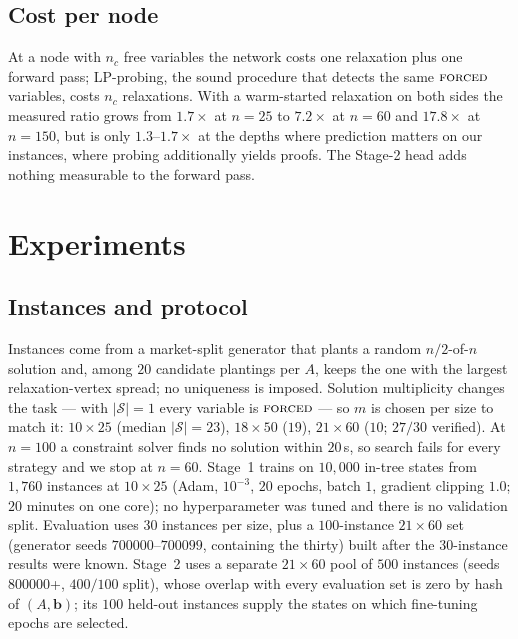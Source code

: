 \documentclass[final,5p,times,twocolumn]{elsarticle}
\newcommand{\SOL}{\mathcal{S}}
\newcommand{\FORCED}{\textsc{forced}}
\begin{document}
\subsection{Cost per node}
\label{sec:method-cost}

At a node with $n_c$ free variables the network costs one relaxation plus one forward pass; LP-probing, the sound procedure that detects the same $\FORCED$ variables, costs $n_c$ relaxations. With a warm-started relaxation on both sides the measured ratio grows from $1.7\times$ at $n=25$ to $7.2\times$ at $n=60$ and $17.8\times$ at $n=150$, but is only $1.3$--$1.7\times$ at the depths where prediction matters on our instances, where probing additionally yields proofs. The Stage-2 head adds nothing measurable to the forward pass.

\section{Experiments}
\label{sec:exp}

\subsection{Instances and protocol}
\label{sec:exp-protocol}

Instances come from a market-split generator that plants a random $n/2$-of-$n$ solution and, among $20$ candidate plantings per $A$, keeps the one with the largest relaxation-vertex spread; no uniqueness is imposed. Solution multiplicity changes the task --- with $|\SOL|=1$ every variable is $\FORCED$ --- so $m$ is chosen per size to match it: $10\times25$ (median $|\SOL|=23$), $18\times50$ ($19$), $21\times60$ ($10$; $27/30$ verified). At $n=100$ a constraint solver finds no solution within $20$\,s, so search fails for every strategy and we stop at $n=60$. Stage~1 trains on $10{,}000$ in-tree states from $1{,}760$ instances at $10\times25$ (Adam, $10^{-3}$, $20$ epochs, batch $1$, gradient clipping $1.0$; $20$ minutes on one core); no hyperparameter was tuned and there is no validation split. Evaluation uses $30$ instances per size, plus a $100$-instance $21\times60$ set (generator seeds $700000$--$700099$, containing the thirty) built after the $30$-instance results were known. Stage~2 uses a separate $21\times60$ pool of $500$ instances (seeds $800000$+, $400/100$ split), whose overlap with every evaluation set is zero by hash of $(A,\mathbf{b})$; its $100$ held-out instances supply the states on which fine-tuning epochs are selected.
\end{document}
